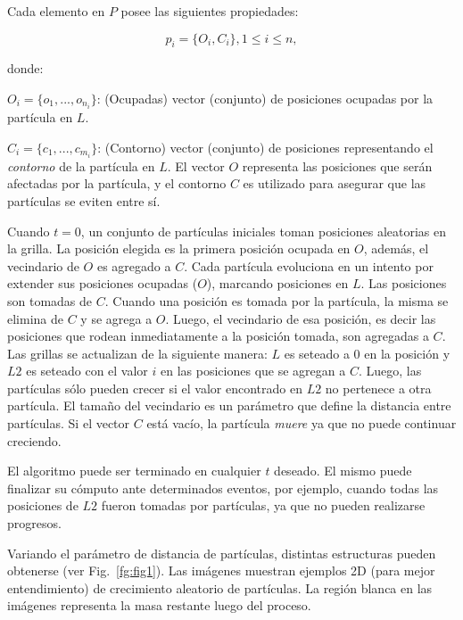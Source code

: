 \documentclass[oneside,a4paper,spanish,links]{amca}
\begin{document}
Cada elemento en $P$ posee las siguientes propiedades:

\begin{equation}
  p_{i} = \{O_{i}, C_{i}\}, 1 \le i \le n,
\end{equation}

\noindent donde:

$O_{i} = \{o_{1}, ... , o_{n_{i}}\}$: (Ocupadas) vector (conjunto) de posiciones ocupadas por la part\'icula en $L$.

$C_{i} = \{c_{1}, ... , c_{m_{i}}\}$: (Contorno) vector (conjunto) de posiciones representando el {\em contorno} de la part\'icula en $L$. El vector $O$ representa las posiciones que ser\'an afectadas por la part\'icula, y el contorno $C$ es utilizado para asegurar que las part\'iculas se eviten entre s\'i.

Cuando $t = 0$, un conjunto de part\'iculas iniciales toman posiciones aleatorias en la grilla. La posici\'on elegida es la primera posici\'on ocupada en $O$, adem\'as, el vecindario de $O$ es agregado a $C$. Cada part\'icula evoluciona en un intento por extender sus posiciones ocupadas ($O$), marcando posiciones en $L$. Las posiciones son tomadas de $C$. Cuando una posici\'on es tomada por la part\'icula, la misma se elimina de $C$ y se agrega a $O$. Luego, el vecindario de esa posici\'on, es decir las posiciones que rodean inmediatamente a la posici\'on tomada, son agregadas a $C$. Las grillas se actualizan de la siguiente manera: $L$ es seteado a $0$ en la posici\'on y $L2$ es seteado con el valor $i$ en las posiciones que se agregan a $C$. Luego, las part\'iculas s\'olo pueden crecer si el valor encontrado en $L2$ no pertenece a otra part\'icula. El tama\~no del vecindario es un par\'ametro que define la distancia entre part\'iculas. Si el vector $C$ est\'a vac\'io, la part\'icula {\em muere} ya que no puede continuar creciendo.

El algoritmo puede ser terminado en cualquier $t$ deseado. El mismo puede finalizar su c\'omputo ante determinados eventos, por ejemplo, cuando todas las posiciones de $L2$ fueron tomadas por part\'iculas, ya que no pueden realizarse progresos.

Variando el par\'ametro de distancia de part\'iculas, distintas estructuras pueden obtenerse (ver Fig.~\ref{fg:fig1}). Las im\'agenes muestran ejemplos 2D (para mejor entendimiento) de crecimiento aleatorio de part\'iculas. La regi\'on blanca en las im\'agenes representa la masa restante luego del proceso.
\end{document}
